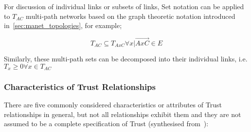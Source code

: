 For discussion of individual links or subsets of links, Set notation can be applied to $T_{AC}$ multi-path networks based on the graph theoretic notation introduced in~\autoref{sec:manet_topologies}, for example;

\begin{equation}
	T_{AC} \subseteq T_{AxC} \forall x | \overrightarrow{AxC} \in E
\end{equation}

Similarly, these multi-path sets can be decomposed into their individual links, i.e. $T_x \ge 0 \forall x \in T_{AC}$
\subsubsection{Characteristics of Trust Relationships}

There are five commonly considered characteristics or attributes of Trust relationships in general, but not all relationships exhibit them and they are not assumed to be a complete specification of Trust (synthesised from~\cite{Liu2006,Mayer1995, Mcknight1996, Pavan2015}):

